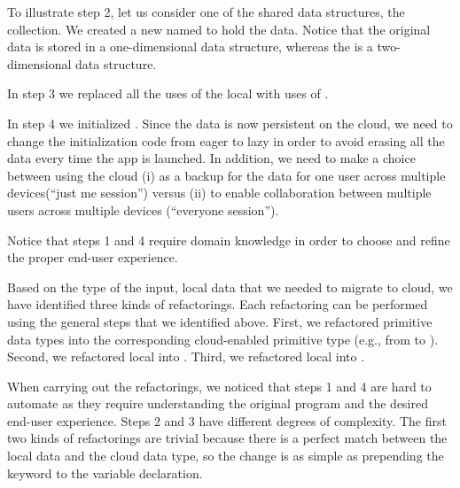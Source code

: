 \documentclass{sigplanconf}
\begin{document}
To illustrate step 2, let us consider one of the shared data structures, the  collection. 
We created a new  named  to hold the data. Notice that the
original data is stored in a one-dimensional data structure, whereas the  is a two-dimensional data 
structure.

In step 3 we replaced all the uses of the local  with uses of . 

In step 4 we initialized  . 
Since the data is now persistent on the cloud, we need to change the initialization code from 
eager to lazy in order to avoid erasing all the data every time the app is launched.  
In addition, we need to make a choice between using the cloud (i) as a backup for the data for one user across multiple devices(``just me session'') versus (ii) to enable collaboration between multiple users across multiple devices (``everyone session'').

Notice that steps 1 and 4 require domain knowledge in order to choose and refine the proper end-user experience.  
 
Based on the type of the input, local data that we needed to migrate to cloud, we have identified three kinds of refactorings. Each refactoring can be performed using the general steps that we identified above. First, we refactored primitive data 
types into the corresponding cloud-enabled primitive type (e.g., from  to ).
Second, we refactored local  into . Third, we refactored local 
into .

When carrying out the refactorings, we noticed that steps 1 and 4 are hard to automate as they require understanding the original program and the desired end-user experience. Steps 2 and 3 have different degrees of complexity. 
The first two kinds of refactorings  are trivial because there is a perfect match between the local data and the cloud data type, so the change is as simple as prepending the keyword  to the variable declaration. 
\end{document}
